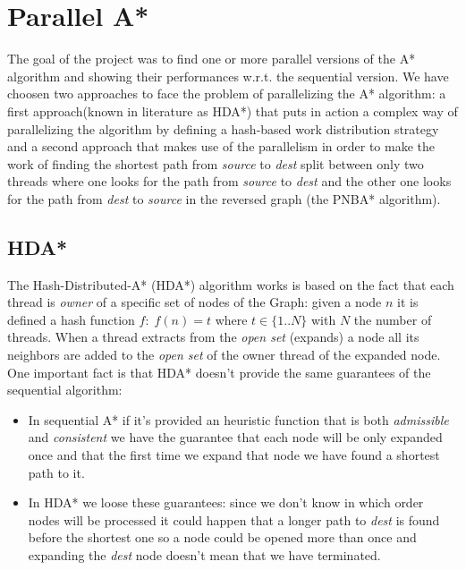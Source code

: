 \documentclass[twocolumn, switch]{article} %
\begin{document}
\section{Parallel A*}
The goal of the project was to find one or more parallel versions of the A* algorithm 
and showing their performances w.r.t. the sequential version. We have choosen two approaches
to face the problem of parallelizing the A* algorithm: a first approach(known in literature as HDA*) that puts in action a
complex way of parallelizing the algorithm by defining a hash-based work distribution strategy and
a second approach that makes use of the parallelism in order to make the work of
finding the shortest path from \textit{source} to \textit{dest} split between only two threads
where one looks for the path from \textit{source} to \textit{dest} and the other one looks
for the path from \textit{dest} to \textit{source} in the reversed graph (the PNBA* algorithm).

\subsection{HDA*}
The Hash-Distributed-A* (HDA*) algorithm works is based on the fact that each thread is \textit{owner} of a
specific set of nodes of the Graph: given a node $n$ it is defined a hash function $f:\;f(n) = t$
where $t \in \{1..N\}$ with $N$ the number of threads. When a thread extracts from the \textit{open set}
(expands) a node all its neighbors are added to the \textit{open set} of the owner thread of the expanded node. 
One important fact is that HDA* doesn't provide the same guarantees of the sequential algorithm:
\begin{itemize}
  \item In sequential A* if it's provided an heuristic function that is both \textit{admissible}
        and \textit{consistent} we have the guarantee that each node will be only expanded once
        and that the first time we expand that node we have found a shortest path to it.
  \item In HDA* we loose these guarantees: since we don't know in which order nodes will be processed
        it could happen that a longer path to \textit{dest} is found before the shortest one so
        a node could be opened more than once and expanding the \textit{dest} node doesn't
        mean that we have terminated.
\end{itemize}
\end{document}
